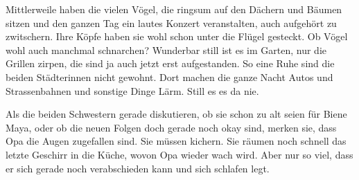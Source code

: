Mittlerweile haben die vielen Vögel, die ringsum auf den Dächern und Bäumen sitzen und den ganzen Tag ein lautes Konzert veranstalten, auch aufgehört zu zwitschern. Ihre Köpfe haben sie wohl schon unter die Flügel gesteckt. Ob Vögel wohl auch manchmal schnarchen? Wunderbar still ist es im Garten, nur die Grillen zirpen, die sind ja auch jetzt erst aufgestanden.  So eine Ruhe sind die beiden Städterinnen nicht gewohnt. Dort machen die ganze Nacht Autos und Strassenbahnen und sonstige Dinge Lärm. Still es es da nie. 


Als die beiden Schwestern gerade diskutieren, ob sie schon zu alt seien für Biene Maya, oder ob die neuen Folgen doch gerade noch okay sind, merken sie, dass Opa die Augen zugefallen sind. Sie müssen kichern. Sie räumen noch schnell das letzte Geschirr in die Küche, wovon Opa wieder wach wird. Aber nur so viel, dass er sich gerade noch verabschieden kann und sich schlafen legt.


